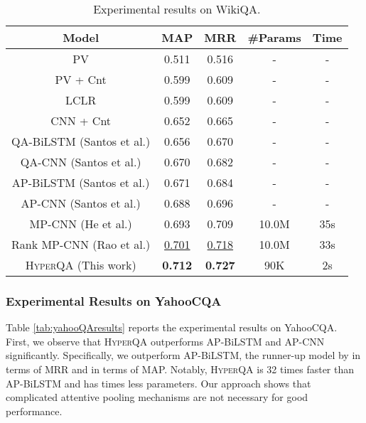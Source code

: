 \documentclass[sigconf]{acmart}
\begin{document}
\begin{table}[ht]
  \centering
\small
    \begin{tabular}{ccccc}
    \hline
       Model   & MAP   & MRR   & \#Params & Time \\
          \hline
    PV  & 0.511 & 0.516 & -     & - \\
    PV + Cnt  & 0.599 & 0.609 & -     & - \\
    LCLR & 0.599 & 0.609 & -     & - \\


    CNN + Cnt & 0.652 & 0.665 & -     & - \\
    QA-BiLSTM  (Santos et al.)& 0.656 & 0.670 & -    & - \\
    QA-CNN  (Santos et al.)& 0.670 & 0.682 & -    & - \\
    AP-BiLSTM  (Santos et al.)& 0.671 & 0.684 & -     & - \\
    AP-CNN (Santos et al.) & 0.688 & 0.696 & -    & - \\
    MP-CNN (He et al.) & 0.693 & 0.709 & 10.0M   & 35s\\
    Rank MP-CNN (Rao et al.) & \underline{0.701} & \underline{0.718} & 10.0M  & 33s \\

   \hline
    \textsc{HyperQA} (This work) & \textbf{0.712} & \textbf{0.727} & 90K   & 2s \\
    \hline
    \end{tabular}

      \caption{Experimental results on WikiQA.}
  \label{tab:wiki_results}\end{table}\subsubsection{Experimental Results on YahooCQA}





Table \ref{tab:yahooQAresults} reports the experimental results on YahooCQA. First, we observe that \textsc{HyperQA} outperforms AP-BiLSTM and AP-CNN significantly. Specifically, we outperform AP-BiLSTM, the runner-up model by  in terms of MRR and  in terms of MAP. Notably, \textsc{HyperQA} is 32 times faster than AP-BiLSTM and has  times less parameters. Our approach shows that complicated attentive pooling mechanisms are not necessary for good performance. 
\end{document}
